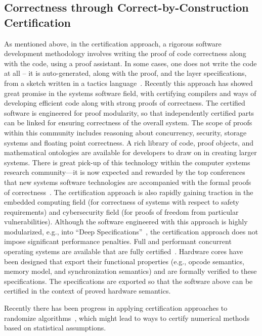 \subsection{Correctness through Correct-by-Construction Certification}
As mentioned above, in the certification approach, a rigorous software development methodology involves writing the proof of code correctness along with the code, using a proof assistant.  In some cases, one does not write the code at all -- it is auto-generated, along with the proof, and the layer specifications, from a sketch written in a tactics language~\cite{WengPhD2016}. Recently this approach has showed great promise in the systems software field, with certifying compilers and ways of developing efficient code along with strong proofs of correctness. The certified software is engineered for proof modularity, so that independently certified parts can be linked for ensuring correctness of the overall system.  The scope of proofs within this community includes reasoning about concurrency, security, storage systems and floating point correctness.  A rich library of code, proof objects, and mathematical ontologies are available for developers to draw on in creating larger systems.  There is great pick-up of this technology within the computer systems research community---it is now expected and rewarded by the top conferences that new systems software technologies are accompanied with the formal proofs of correctness~\cite{chen2015using}.  The certification approach is also rapidly gaining traction in the embedded computing field (for correctness of systems with respect to safety requirements) and cybersecurity field (for proofs of freedom from particular vulnerabilities). Although the software engineered with this approach is highly modularized, e.g., into ``Deep Specifications''~\cite{gu2015deep}, the certification approach does not impose significant performance penalties.  Full and performant concurrent operating systems are available that are fully certified~\cite{gu2016certikos}.  Hardware cores have been designed that export their functional properties (e.g., opcode semantics, memory model, and synchronization semantics) and are formally verified to these specifications.  The specifications are exported so that the software above can be certified in the context of proved hardware semantics.  
Recently there has been progress in applying certification approaches to randomize algorithms~\cite{BEGGHS16}, which might lead to ways to certify numerical methods based on statistical assumptions.




